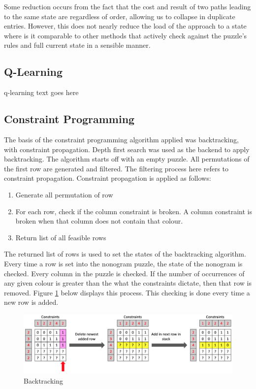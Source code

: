 \documentclass{svproc}
\begin{document}
Some reduction occurs from the fact that the cost and result of two paths leading to the same state are regardless of order, allowing us to collapse in duplicate entries. However, this does not nearly reduce the load of the approach to a state where is it comparable to other methods that actively check against the puzzle's rules and full current state in a sensible manner.

\subsection{Q-Learning}
q-learning text goes here

\subsection{Constraint Programming}
The basis of the constraint programming algorithm applied was backtracking, with constraint propagation. Depth first search was used as the backend to apply backtracking. The algorithm starts off with an empty puzzle. All permutations of the first row are generated and filtered. The filtering process here refers to  constraint propagation. Constraint propagation is applied as follows:

\begin{enumerate}
    \item Generate all permutation of row
    \item For each row, check if the column constraint is broken. A column constraint is broken when that column does not contain that colour.
    \item Return list of all feasible rows
\end{enumerate}

The returned list of rows is used to set the states of the backtracking algorithm. Every time a row is set into the nonogram puzzle, the state of the nonogram is checked. Every column in the puzzle is checked. If the number of occurrences of any given colour is greater than the what the constraints dictate, then that row is removed. Figure \ref{fig:Backtrack} below displays this process. This checking is done every time a new row is added.

\begin{figure}[h]
    \centering
    \includegraphics[scale=0.36]{Backtracking.png}
    \caption{Backtracking}
    \label{fig:Backtrack}
\end{figure}
\end{document}
